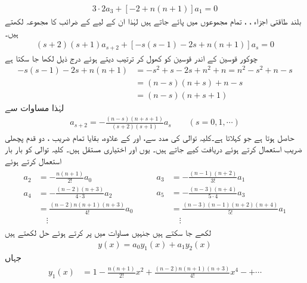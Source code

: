 \begin{align}\label{مساوات_بیسل_لیژانڈر_ت}
3\cdot 2 a_3+[-2+n(n+1)]a_1=0
\end{align}
بلند طاقتی اجزاء ، ،  تمام مجموعوں میں پائے جاتے ہیں لہٰذا ان کے لیے  کے ضرائب  کا مجموعہ لکھتے ہیں۔
\begin{align}\label{مساوات_بیسل_لیژانڈر_ٹ}
(s+2)(s+1)a_{s+2}+[-s(s-1)-2s+n(n+1)]a_s=0
\end{align} 
چوکور قوسین  کے اندر قوسین کو کھول کر ترتیب دیتے ہوئے درج ذیل لکھا جا سکتا ہے
\begin{align*}
-s(s-1)-2s+n(n+1)&=-s^2+s-2s+n^2+n=n^2-s^2+n-s\\
&=(n-s)(n+s)+n-s\\
&=(n-s)(n+s+1)
\end{align*}
لہٰذا مساوات  سے 
\begin{align}\label{مساوات_بیسل_کلیہ_توالی_الف}
a_{s+2}=-\frac{(n-s)(n+s+1)}{(s+2)(s+1)}a_s \quad \quad (s=0,1,\cdots)
\end{align}
حاصل ہوتا ہے جو  کہلاتا ہے۔کلیہ توالی کی مدد سے،  اور  کے علاوہ،  بقایا تمام  ضریب ، دو قدم پچھلی  ضریب  استعمال کرتے ہوئے دریافت کیے جاتے ہیں۔ یوں  اور   اختیاری مستقل ہیں۔ کلیہ توالی کو بار بار استعمال کرتے ہوئے
\begin{gather*}
\begin{aligned}
a_2&=-\frac{n(n+1)}{2!}a_0\\
a_4&=-\frac{(n-2)(n+3)}{4\cdot 3}a_2\\
&=\frac{(n-2)n(n+1)(n+3)}{4!}a_0\\
&\quad\vdots
\end{aligned}\quad\quad
\begin{aligned}
a_3&=-\frac{(n-1)(n+2)}{3!}a_1\\
a_5&=-\frac{(n-3)(n+4)}{5\cdot 4}a_3\\
&=\frac{(n-3)(n-1)(n+2)(n+4)}{5!}a_1\\
&\quad \vdots
\end{aligned}
\end{gather*}
لکھے جا سکتے ہیں جنہیں مساوات  میں پر کرتے ہوئے حل لکھتے ہیں
\begin{align}\label{مساوات_بیسل_حل_لیژانڈر}
y(x)=a_0y_1(x)+a_1y_2(x)
\end{align}
جہاں
\begin{align}\label{مساوات_بیسل_حل_لیژانڈر_الف}
y_1(x)&=1-\frac{n(n+1)}{2!}x^2+\frac{(n-2)n(n+1)(n+3)}{4!}x^4-+\cdots
\end{align}
